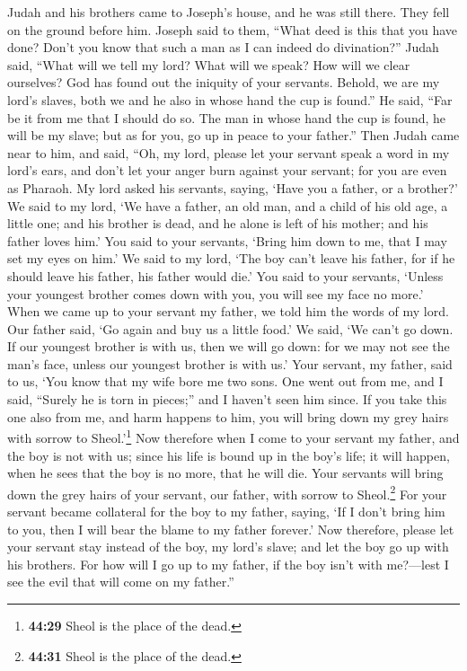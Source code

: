  Judah and his brothers came to Joseph's house, and he
was still there. They fell on the ground before him. 
Joseph said to them, ``What deed is this that you have done? Don't you
know that such a man as I can indeed do divination?'' 
Judah said, ``What will we tell my lord? What will we speak? How will we
clear ourselves? God has found out the iniquity of your servants.
Behold, we are my lord's slaves, both we and he also in whose hand the
cup is found.''  He said, ``Far be it from me that I
should do so. The man in whose hand the cup is found, he will be my
slave; but as for you, go up in peace to your father.'' 
Then Judah came near to him, and said, ``Oh, my lord, please let your
servant speak a word in my lord's ears, and don't let your anger burn
against your servant; for you are even as Pharaoh.  My
lord asked his servants, saying, `Have you a father, or a brother?'
 We said to my lord, `We have a father, an old man, and a
child of his old age, a little one; and his brother is dead, and he
alone is left of his mother; and his father loves him.' 
You said to your servants, `Bring him down to me, that I may set my eyes
on him.'  We said to my lord, `The boy can't leave his
father, for if he should leave his father, his father would die.'
 You said to your servants, `Unless your youngest brother
comes down with you, you will see my face no more.'  When
we came up to your servant my father, we told him the words of my lord.
 Our father said, `Go again and buy us a little food.'
 We said, `We can't go down. If our youngest brother is
with us, then we will go down: for we may not see the man's face, unless
our youngest brother is with us.'  Your servant, my
father, said to us, `You know that my wife bore me two sons.
 One went out from me, and I said, ``Surely he is torn in
pieces;'' and I haven't seen him since.  If you take this
one also from me, and harm happens to him, you will bring down my grey
hairs with sorrow to Sheol.'\footnote{\textbf{44:29} Sheol is the place
  of the dead.}  Now therefore when I come to your
servant my father, and the boy is not with us; since his life is bound
up in the boy's life;  it will happen, when he sees that
the boy is no more, that he will die. Your servants will bring down the
grey hairs of your servant, our father, with sorrow to Sheol.\footnote{\textbf{44:31}
  Sheol is the place of the dead.}  For your servant
became collateral for the boy to my father, saying, `If I don't bring
him to you, then I will bear the blame to my father forever.'
 Now therefore, please let your servant stay instead of
the boy, my lord's slave; and let the boy go up with his brothers.
 For how will I go up to my father, if the boy isn't with
me?---lest I see the evil that will come on my father.''

